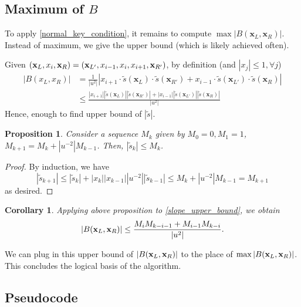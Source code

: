 \documentclass{article}
\theoremstyle{definition}
\theoremstyle{plain}
\newtheorem{corollary}[theorem]{Corollary}
\newtheorem{proposition}{Proposition}[section]
\theoremstyle{remark}
\numberwithin{equation}{section}
\newcommand{\abs}[1]{\left\lvert{#1}\right\rvert}
\begin{document}
\subsection{Maximum of $B$}

To apply \eqref{normal_key_condition},
it remains to compute $\max \abs{B(\mathbf{x}_L, \mathbf{x}_R)}$.
Instead of maximum, we give the upper bound (which is likely achieved often).

Given $(\mathbf{x}_L, x_i, \mathbf{x}_R) = (\mathbf{x}_{L'}, x_{i-1}, x_i, x_{i+1}, \mathbf{x}_{R'})$,
by definition (and $\abs{x_j} \leq 1, \forall j$)
\begin{equation}\label{slope_upper_bound}
  \begin{aligned}
    \abs{B(x_L, x_R)}
    & = \frac{1}{\abs{u^2}}
    \abs{x_{i+1} \cdot \tilde{s}(\mathbf{x}_L) \cdot \tilde{s}(\mathbf{x}_{R'})
    + x_{i-1} \cdot \tilde{s}(\mathbf{x}_{L'}) \cdot \tilde{s}(\mathbf{x}_R)} \\
    & \leq \frac{\abs{x_{i+1}} \abs{\tilde{s}(\mathbf{x}_L)} \abs{\tilde{s}(\mathbf{x}_{R'})}
    + \abs{x_{i-1}} \abs{\tilde{s}(\mathbf{x}_{L'})} \abs{\tilde{s}(\mathbf{x}_R)}}{\abs{u^2}}
  \end{aligned}
\end{equation}
Hence, enough to find upper bound of $\abs{\tilde{s}}$.

\begin{proposition}
  Consider a sequence $M_k$ given by $M_0 = 0, M_1 = 1$, $M_{k+1} = M_k + \abs{u^{-2}} M_{k-1}$.
  Then, $\abs{\tilde{s}_k} \leq M_k$.
\end{proposition}
\begin{proof}
  By induction, we have
  \[
    \abs{\tilde{s}_{k+1}}
    \leq \abs{\tilde{s}_k} + \abs{x_k} \abs{x_{k-1}} \abs{u^{-2}} \abs{\tilde{s}_{k-1}}
    \leq M_k + \abs{u^{-2}} M_{k-1} = M_{k+1}
  \]
  as desired.
\end{proof}

\begin{corollary}
  Applying above proposition to \eqref{slope_upper_bound}, we obtain
  \[
    \abs{B(\xsL, \xsR)} \leq \frac{M_i M_{k-i-1} + M_{i-1} M_{k-i}}{\abs{u^2}}.
  \]
\end{corollary}

We can plug in this upper bound of $\abs{B(\xsL, \xsR)}$ to the place of  $\max \abs{B(\xsL, \xsR)}$.
This concludes the logical basis of the algorithm.

\subsection{Pseudocode}
\end{document}
